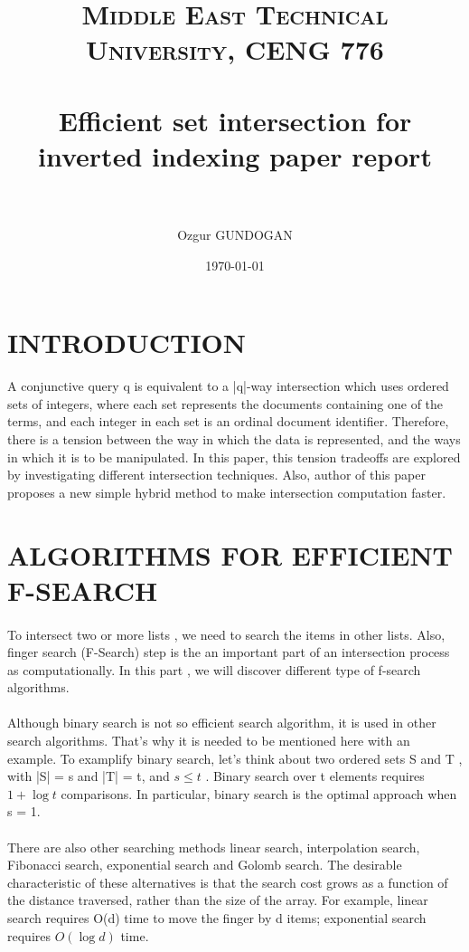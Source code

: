 \documentclass[paper=a4, fontsize=11pt]{scrartcl} %
\title{	
\normalfont \normalsize 
\textsc{Middle East Technical University, CENG 776} \\ [25pt] %
\horrule{0.5pt} \\[0.4cm] %
\huge Efficient set intersection for inverted indexing paper report \\ %
\horrule{2pt} \\[0.5cm] %
}
\author{Ozgur GUNDOGAN} %
\date{\normalsize\today} %
\numberwithin{equation}{section} %
\numberwithin{figure}{section} %
\numberwithin{table}{section} %
\begin{document}
\maketitle %


\section{INTRODUCTION}

A conjunctive query q is equivalent to a |q|-way intersection which uses ordered sets of integers, where each set represents the documents containing one of the terms, and each integer in each set is an ordinal document identifier. Therefore, there is a tension between the way in which the data is represented, and the ways in which it is to be manipulated. In this paper, this tension tradeoffs are explored by investigating different intersection techniques. Also, author of this paper proposes a new simple hybrid method to make intersection computation faster.

\section{ALGORITHMS FOR EFFICIENT F-SEARCH}
\paragraph{}
To intersect two or more lists , we need to search the items in other lists. Also, finger search (F-Search) step is the an important part of an intersection process as computationally.  In this part , we will discover different type of f-search algorithms.
\paragraph{}
Although binary search is not so efficient search algorithm, it is used in other search algorithms. That's why it is needed to be mentioned here with an example. 
To examplify binary search, let's think about two ordered sets S and T , with |S| = s  and  |T| = t, and $s \leq t$ . Binary search over t elements requires $1+\log t$ comparisons. In particular, binary search is the optimal approach when s = 1.

\paragraph{}
There are also other searching methods linear search, interpolation search, Fibonacci search, exponential search and Golomb search. The desirable characteristic of these alternatives is that the search cost grows as a function of the distance traversed, rather than the size of the array. For example, linear search requires O(d) time to move the finger by d items; exponential search requires $O(\log d)$ time.
\end{document}
